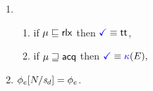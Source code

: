 \begin{minipage}{1.0\linewidth}
\begin{multicols}{2}
\begin{enumerate}[topsep=0pt,label=(\textsc{r}\arabic*),ref=\textsc{r}\arabic*]
    \item[] 
      \begin{enumerate}[leftmargin=0pt]
      \item \label{read-term-nonempty-ca}
        if $\mu\sqsubseteq{\mathsf{rlx}}$ then $\aTerm \riff \TRUE$,
      \item \label{read-term-empty-ca}
        if $\mu\sqsupseteq{\mathsf{acq}}$ then
        \begin{math}
          \aTerm \riff
          \kappaE{}, %
        \end{math}
      \end{enumerate}      
    \item \label{read-phi}
      $\phi_e[N/\mathit{s}_{d}]=\phi_e$.
    \end{enumerate}

\end{multicols}
\end{minipage}
